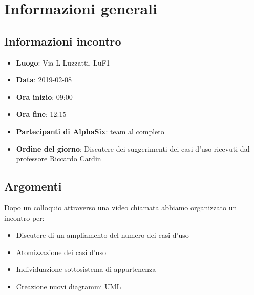 \newcommand{\documento}{\VI}
\newcommand{\nomedocumentofisico}{VI\_2019-02-08.pdf}
\newcommand{\redazione}{\SG}
\newcommand{\verifica}{\LC}
\newcommand{\approvazione}{\TG}
\newcommand{\versione}{1.0.0}
\newcommand{\uso}{Interno}
\newcommand{\destinateTo}{\gruppo}
\newcommand{\datacreazione}{10 febbraio 2019}
\newcommand{\datamodifica}{12 febbraio 2019}
\newcommand{\stato}{Approvato}

\def\TABELLE{false}	%
\def\FIGURE{false} 	%






    

    	
    
    \section{Informazioni generali}
		\subsection{Informazioni incontro}
			\begin{itemize}
				\item {\textbf{Luogo}: Via L Luzzatti, LuF1}
				\item {\textbf{Data}: 2019-02-08}
				\item {\textbf{Ora inizio}: 09:00}
				\item {\textbf{Ora fine}: 12:15}
				\item {\textbf{Partecipanti di AlphaSix}: team al completo}
				\item {\textbf{Ordine del giorno}: Discutere dei suggerimenti dei casi d'uso ricevuti dal professore Riccardo Cardin}
			\end{itemize}

        \subsection{Argomenti}
            Dopo un colloquio attraverso una video chiamata  abbiamo organizzato un incontro per:
            \begin{itemize}
                \item Discutere di un ampliamento del numero dei casi d'uso
                \item Atomizzazione dei casi d'uso
                \item Individuazione sottosistema di appartenenza
                \item Creazione nuovi diagrammi UML                
            \end{itemize}

